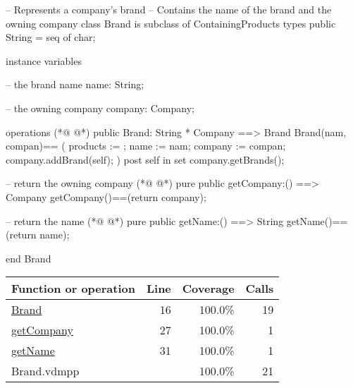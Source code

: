 \begin{vdmpp}[breaklines=true]
-- Represents a company's brand
-- Contains the name of the brand and the owning company
class Brand is subclass of ContainingProducts
 types
  public String = seq of char;
  
 instance variables
 
   -- the brand name
  name: String;
  
  -- the owning company
   company: Company;
  
  operations 
(*@
\label{Brand:16}
@*)
   public Brand: String * Company ==> Brand
   Brand(nam, compan)==
   (
    products := {};
    name := nam;
    company := compan;
    company.addBrand(self);
   )
   post self in set company.getBrands();
   
   -- return the owning company
(*@
\label{getCompany:27}
@*)
   pure public getCompany:() ==> Company
   getCompany()==(return company);
   
   -- return the name
(*@
\label{getName:31}
@*)
   pure public getName:() ==> String
   getName()==(return name);
   
end Brand
\end{vdmpp}
\bigskip
\begin{longtable}{|l|r|r|r|}
\hline
Function or operation & Line & Coverage & Calls \\
\hline
\hline
\hyperref[Brand:16]{Brand} & 16&100.0\% & 19 \\
\hline
\hyperref[getCompany:27]{getCompany} & 27&100.0\% & 1 \\
\hline
\hyperref[getName:31]{getName} & 31&100.0\% & 1 \\
\hline
\hline
Brand.vdmpp & & 100.0\% & 21 \\
\hline
\end{longtable}

